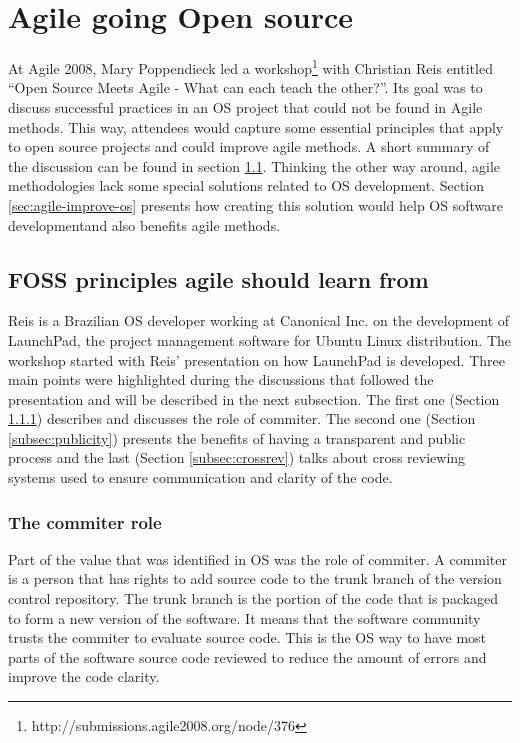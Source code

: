 \chapter{Agile going Open source}
\label{cap:agile}

At Agile 2008, Mary Poppendieck led a
workshop\footnote{http://submissions.agile2008.org/node/376} with
Christian Reis entitled ``Open Source Meets Agile - What can each
teach the other?''. Its goal was to discuss successful practices in an
OS project that could not be found in Agile methods. This way,
attendees would capture some essential principles that apply to open
source projects and could improve agile methods. A short summary of
the discussion can be found in section \ref{sec:foss-over-agile}.
Thinking the other way around, agile methodologies lack some special
solutions related to OS development. Section
\ref{sec:agile-improve-os} presents how creating this solution
would help OS software developmentand also benefits agile methods.

\section{FOSS principles agile should learn from}
\label{sec:foss-over-agile}

Reis is a Brazilian OS developer working at Canonical Inc. on the
development of LaunchPad, the project management software for Ubuntu
Linux distribution. The workshop started with Reis' presentation on
how LaunchPad is developed. Three main points were highlighted during
the discussions that followed the presentation and will be described
in the next subsection. The first one (Section
\ref{subsec:commiter}) describes and discusses the role of
commiter. The second one (Section \ref{subsec:publicity}) presents
the benefits of having a transparent and public process and the last
(Section \ref{subsec:crossrev}) talks about cross reviewing systems
used to ensure communication and clarity of the code.

\subsection{The commiter role}
\label{subsec:commiter}

Part of the value that was identified in OS was the role of commiter.
A commiter is a person that has rights to add source code to the trunk
branch of the version control repository. The trunk branch is the
portion of the code that is packaged to form a new version of the
software. It means that the software community trusts the commiter to
evaluate source code. This is the OS way to have most parts of the
software source code reviewed to reduce the amount of errors and
improve the code clarity.

